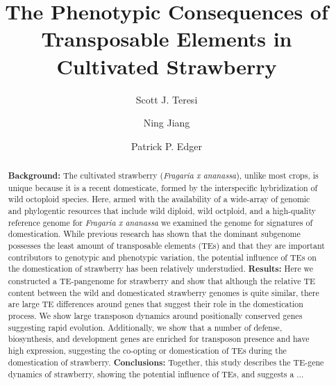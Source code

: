 \documentclass[fleqn,10pt]{olplainarticle}
\begin{document}



\title{The Phenotypic Consequences of Transposable Elements in Cultivated Strawberry}

\author[1,2]{Scott J. Teresi}
\author[1]{Ning Jiang}
\author[1,2]{Patrick P. Edger}

\begin{abstract}
\textbf{Background:}
The cultivated strawberry (\textit{Fragaria x ananassa}), unlike most crops, is unique because it is a recent domesticate, formed by the interspecific hybridization of wild octoploid species.
Here, armed with the availability of a wide-array of genomic and phylogentic resources that include wild diploid, wild octploid, and a high-quality reference genome for \textit{Fragaria x ananassa} we examined the genome for signatures of domestication.
While previous research has shown that the dominant subgenome possesses the least amount of transposable elements (TEs) and that they are important contributors to genotypic and phenotypic variation, the potential influence of TEs on the domestication of strawberry has been relatively understudied.
\newline
\textbf{Results:}
Here we constructed a TE-pangenome for strawberry and show that although the relative TE content between the wild and domesticated strawberry genomes is quite similar, there are large TE differences around genes that suggest their role in the domestication process.
We show large transposon dynamics around positionally conserved genes suggesting rapid evolution.
Additionally, we show that a number of defense, biosynthesis, and development genes are enriched for transposon presence and have high expression, suggesting the co-opting or domestication of TEs during the domestication of strawberry. %
\newline
\textbf{Conclusions:}
Together, this study describes the TE-gene dynamics of strawberry, showing the potential influence of TEs, and suggests a ...
\end{abstract}
\end{document}
